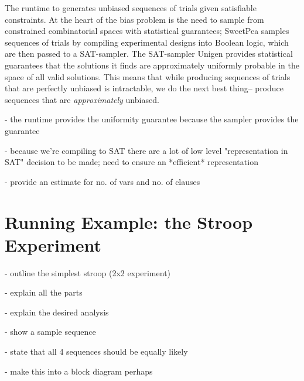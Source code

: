 The runtime to generates unbiased sequences of trials given satisfiable constraints. At the heart of the bias problem is the need to sample from constrained combinatorial spaces with statistical guarantees; SweetPea samples sequences of trials by compiling experimental designs into Boolean logic, which are then passed to a SAT-sampler. The SAT-sampler Unigen %
provides statistical guarantees that the solutions it finds are approximately uniformly probable in the space of all valid solutions. This means that while producing sequences of trials that are perfectly unbiased is intractable, we do the next best thing-- produce sequences that are \emph{approximately} unbiased.

- the runtime provides the uniformity guarantee because the sampler provides the guarantee

- because we're compiling to SAT there are a lot of low level "representation in SAT" decision to be made; need to ensure an *efficient* representation

- provide an estimate for no. of vars and no. of clauses


\section{Running Example: the Stroop Experiment}

- outline the simplest stroop (2x2 experiment)

- explain all the parts

- explain the desired analysis

- show a sample sequence

- state that all 4 sequences should be equally likely

- make this into a block diagram perhaps
